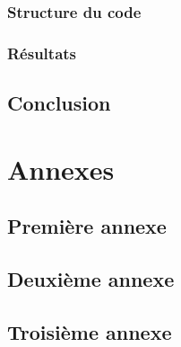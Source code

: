 \documentclass[12pt,fleqn]{report} %
\begin{document}
\section{Structure du code}

\section{Résultats}


\chapter{Conclusion}


\appendix
\part{Annexes}
\chapter{Première annexe}
\chapter{Deuxième annexe}
\chapter{Troisième annexe}

%


\nocite{*}

\end{document}
